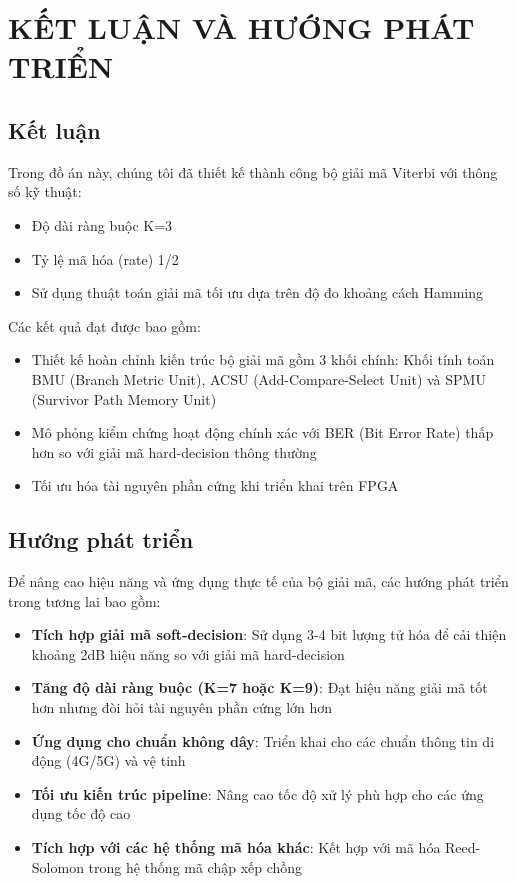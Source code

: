\section{KẾT LUẬN VÀ HƯỚNG PHÁT TRIỂN}

\subsection{Kết luận}
Trong đồ án này, chúng tôi đã thiết kế thành công bộ giải mã Viterbi với thông số kỹ thuật:
\begin{itemize}[label=-]
	\item Độ dài ràng buộc K=3
	\item Tỷ lệ mã hóa (rate) 1/2
	\item Sử dụng thuật toán giải mã tối ưu dựa trên độ đo khoảng cách Hamming
\end{itemize}

Các kết quả đạt được bao gồm:
\begin{itemize}[label=-]
	\item Thiết kế hoàn chỉnh kiến trúc bộ giải mã gồm 3 khối chính: Khối tính toán BMU (Branch Metric Unit), ACSU (Add-Compare-Select Unit) và SPMU (Survivor Path Memory Unit)
	\item Mô phỏng kiểm chứng hoạt động chính xác với BER (Bit Error Rate) thấp hơn so với giải mã hard-decision thông thường
	\item Tối ưu hóa tài nguyên phần cứng khi triển khai trên FPGA
\end{itemize}

\subsection{Hướng phát triển}
Để nâng cao hiệu năng và ứng dụng thực tế của bộ giải mã, các hướng phát triển trong tương lai bao gồm:
\begin{itemize}[label=-]
	\item \textbf{Tích hợp giải mã soft-decision}: Sử dụng 3-4 bit lượng tử hóa để cải thiện khoảng 2dB hiệu năng so với giải mã hard-decision
	\item \textbf{Tăng độ dài ràng buộc (K=7 hoặc K=9)}: Đạt hiệu năng giải mã tốt hơn nhưng đòi hỏi tài nguyên phần cứng lớn hơn
	\item \textbf{Ứng dụng cho chuẩn không dây}: Triển khai cho các chuẩn thông tin di động (4G/5G) và vệ tinh
	\item \textbf{Tối ưu kiến trúc pipeline}: Nâng cao tốc độ xử lý phù hợp cho các ứng dụng tốc độ cao
	\item \textbf{Tích hợp với các hệ thống mã hóa khác}: Kết hợp với mã hóa Reed-Solomon trong hệ thống mã chập xếp chồng
\end{itemize}